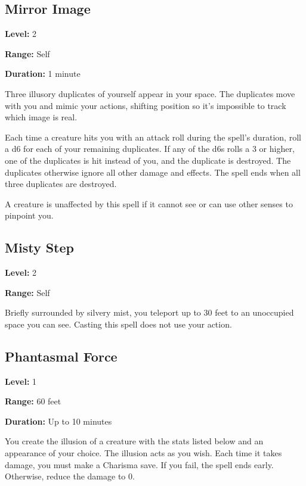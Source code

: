 \documentclass[12pt,letterpaper,twocolumn,openany,nodeprecatedcode,bg=none]{dndbook}
\let\oldsubsection\subsection
\renewcommand{\subsection}[1]{%
  \needspace{5\baselineskip}%
  \oldsubsection{#1}%
}
\begin{document}
\newpage

\subsection{Mirror Image}\label{mirror-image}

\textbf{Level:} 2

\textbf{Range:} Self

\textbf{Duration:} 1 minute

Three illusory duplicates of yourself appear in your space. The
duplicates move with you and mimic your actions, shifting position so
it's impossible to track which image is real.

Each time a creature hits you with an attack roll during the spell's
duration, roll a d6 for each of your remaining duplicates. If any of the
d6s rolls a 3 or higher, one of the duplicates is hit instead of you,
and the duplicate is destroyed. The duplicates otherwise ignore all
other damage and effects. The spell ends when all three duplicates are
destroyed.

A creature is unaffected by this spell if it cannot see or can use other
senses to pinpoint you.

\subsection{Misty Step}\label{misty-step}

\textbf{Level:} 2

\textbf{Range:} Self

Briefly surrounded by silvery mist, you teleport up to 30 feet to an
unoccupied space you can see. Casting this spell does not use your
action.

\newpage

\subsection{Phantasmal Force}\label{phantasmal-force}

\textbf{Level:} 1

\textbf{Range:} 60 feet

\textbf{Duration:} Up to 10 minutes

You create the illusion of a creature with the stats listed below and an
appearance of your choice. The illusion acts as you wish. Each time it
takes damage, you must make a Charisma save. If you fail, the spell ends
early. Otherwise, reduce the damage to 0.
\end{document}
